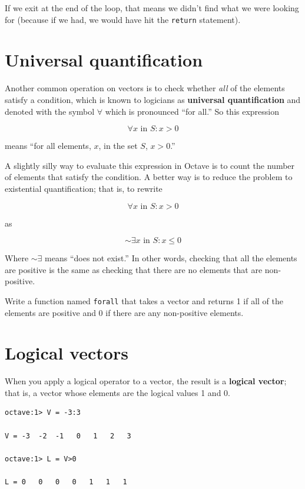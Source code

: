 \documentclass{book}
\begin{document}
If we exit at the end of the loop, that means we didn't find what
we were looking for (because if we had, we would have hit the
{\tt return} statement).



\section{Universal quantification}

Another common operation on vectors is to check whether {\em all}
of the elements satisfy a condition, which is known to
logicians as {\bf universal quantification} and denoted with
the symbol $\forall$ which is pronounced ``for all.'' So this
expression

\[ \forall x \mbox{~in~} S: x>0 \]

means ``for all elements, $x$, in the set $S$, $x>0$.''

A slightly silly way to evaluate this expression in Octave is to
count the number of elements that satisfy the condition.
A better way is to reduce the problem to
existential quantification; that is, to rewrite

\[ \forall x \mbox{~in~} S: x>0 \]

as

\[ \sim \exists x \mbox{~in~} S: x \le 0 \]

Where $\sim \exists$ means ``does not exist.''
In other words, checking that all the elements are positive is
the same as checking that there are no elements 
that are non-positive.

\begin{ex}
Write a function named {\tt forall} that
takes a vector and returns 1 if all of the elements are positive
and 0 if there are any non-positive elements.
\end{ex}




\section{Logical vectors}

When you apply a logical operator to a vector, the result is a {\bf
logical vector}; that is, a vector whose elements are the logical
values 1 and 0.

\begin{verbatim}
octave:1> V = -3:3

V = -3  -2  -1   0   1   2   3

octave:1> L = V>0

L = 0   0   0   0   1   1   1
\end{verbatim}
\end{document}
